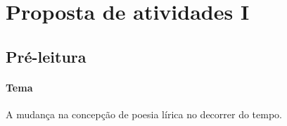 \documentclass[12pt]{extarticle}
\begin{document}

\tableofcontents
\section{Proposta de atividades I}

\subsection{Pré-leitura}








\paragraph{Tema} A mudança na concepção de poesia lírica no decorrer do tempo.
\end{document}
